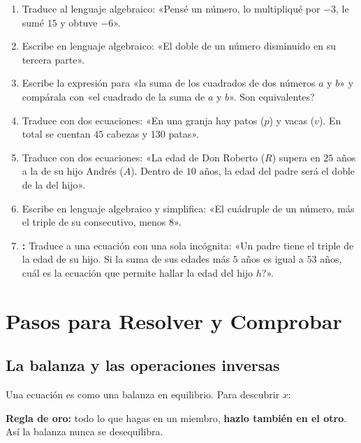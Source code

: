 \documentclass[12pt, letterpaper]{article}
\begin{document}
\begin{enumerate}[leftmargin=*]
  \item \medio{} Traduce al lenguaje algebraico: «Pensé un número, lo multipliqué por $-3$, le sumé $15$ y obtuve $-6$».

  \item \medio{} Escribe en lenguaje algebraico: «El doble de un número disminuido en su tercera parte».

  \item \dificil{} Escribe la expresión para «la suma de los cuadrados de dos números $a$ y $b$» y compárala con «el cuadrado de la suma de $a$ y $b$». \textquestiondown Son equivalentes?

  \item \dificil{} Traduce con dos ecuaciones: «En una granja hay patos ($p$) y vacas ($v$). En total se cuentan $45$ cabezas y $130$ patas».

  \item \dificil{} Traduce con dos ecuaciones: «La edad de Don Roberto ($R$) supera en $25$ años a la de su hijo Andrés ($A$). Dentro de $10$ años, la edad del padre será el doble de la del hijo».

  \item \dificil{} Escribe en lenguaje algebraico y simplifica: «El cuádruple de un número, más el triple de su consecutivo, menos $8$».

  \item \dificil{} \textbf{:} Traduce a una ecuación con una sola incógnita: «Un padre tiene el triple de la edad de su hijo. Si la suma de sus edades más $5$ años es igual a $53$ años, \textquestiondown cuál es la ecuación que permite hallar la edad del hijo $h$?».
\end{enumerate}


\section{Pasos para Resolver y Comprobar}

\subsection{La balanza y las operaciones inversas}

Una ecuación es como una balanza en equilibrio. Para descubrir $x$:

\begin{cuadroteoria}
  \textbf{Regla de oro:} todo lo que hagas en un miembro, \textbf{hazlo también en el otro}. Así la balanza nunca se desequilibra.
\end{cuadroteoria}
\end{document}
